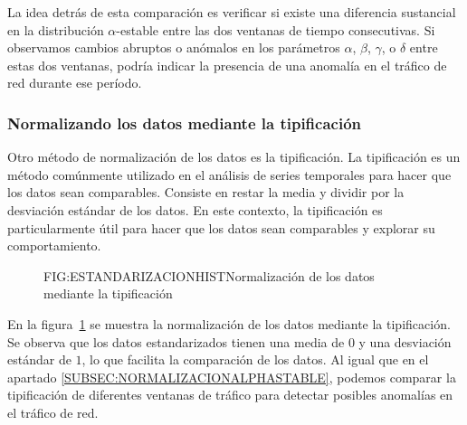 La idea detrás de esta comparación es verificar si existe una diferencia sustancial en la distribución $\alpha$-estable entre las dos ventanas de tiempo consecutivas. Si observamos cambios abruptos o anómalos en los parámetros $\alpha$, $\beta$, $\gamma$, o $\delta$ entre estas dos ventanas, podría indicar la presencia de una anomalía en el tráfico de red durante ese período.

\subsubsection{Normalizando los datos mediante la tipificación}\label{SUBSEC:NORMALIZACIONTIPIFICACION}

Otro método de normalización de los datos es la tipificación. La tipificación es un método comúnmente utilizado en el análisis de series temporales para hacer que los datos sean comparables. Consiste en restar la media y dividir por la desviación estándar de los datos. En este contexto, la tipificación es particularmente útil para hacer que los datos sean comparables y explorar su comportamiento.

\begin{figure}[Normalización de los datos mediante la tipificación]{FIG:ESTANDARIZACIONHIST}{Normalización de los datos mediante la tipificación}
    \label{FIG:ESTANDARIZACIONHIST}
\end{figure}

En la figura~\ref{FIG:ESTANDARIZACIONHIST} se muestra la normalización de los datos mediante la tipificación. Se observa que los datos estandarizados tienen una media de $0$ y una desviación estándar de $1$, lo que facilita la comparación de los datos. 
Al igual que en el apartado \ref{SUBSEC:NORMALIZACIONALPHASTABLE}, podemos comparar la tipificación de diferentes ventanas de tráfico para detectar posibles anomalías en el tráfico de red. 

